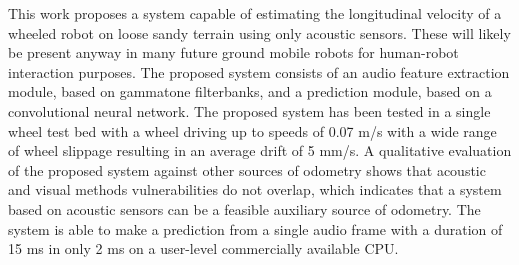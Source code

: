 This work proposes a system capable of estimating the longitudinal velocity of
a wheeled robot on loose sandy terrain using only acoustic sensors. These will
likely be present anyway in many future ground mobile robots for human-robot
interaction purposes. The proposed system consists of an audio feature
extraction module, based on gammatone filterbanks, and a prediction module,
based on a convolutional neural network. The proposed system has been tested in
a single wheel test bed with a wheel driving up to speeds of 0.07 m/s with a
wide range of wheel slippage resulting in an average drift of 5 mm/s. A
qualitative evaluation of the proposed system against other sources of odometry
shows that acoustic and visual methods vulnerabilities do not overlap, which
indicates that a system based on acoustic sensors can be a feasible auxiliary
source of odometry. The system is able to make a prediction from a single audio
frame with a duration of 15 ms in only 2 ms on a user-level commercially
available CPU.